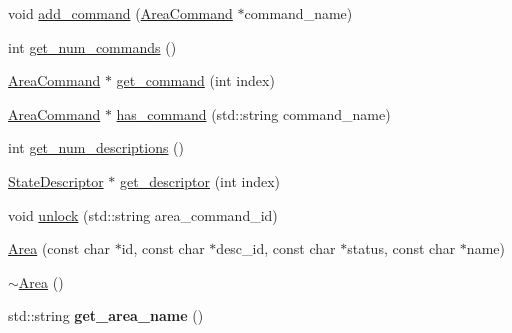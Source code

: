 \begin{DoxyCompactItemize}
\item 
void \hyperlink{class_area_a61f8a73da43dbfa8259a308cb61a28f0}{add\-\_\-command} (\hyperlink{class_area_command}{\-Area\-Command} $\ast$command\-\_\-name)
\item 
int \hyperlink{class_area_a4ba46fedbf3da57ca8bc6de3f50de0a4}{get\-\_\-num\-\_\-commands} ()
\item 
\hyperlink{class_area_command}{\-Area\-Command} $\ast$ \hyperlink{class_area_ae7ee0c8526f4b18b9aca41faf7570e8d}{get\-\_\-command} (int index)
\item 
\hyperlink{class_area_command}{\-Area\-Command} $\ast$ \hyperlink{class_area_a7ed668f761ab79669ad6fb23419b22b2}{has\-\_\-command} (std\-::string command\-\_\-name)
\item 
int \hyperlink{class_area_a917fe473912d321f631be8e1b30e5edf}{get\-\_\-num\-\_\-descriptions} ()
\item 
\hyperlink{class_state_descriptor}{\-State\-Descriptor} $\ast$ \hyperlink{class_area_a94b7cf6ce69e92cddbd4a2a4ec92fbfd}{get\-\_\-descriptor} (int index)
\item 
void \hyperlink{class_area_a6e38f449666617680d0aee968c5c9f57}{unlock} (std\-::string area\-\_\-command\-\_\-id)
\item 
\hyperlink{class_area_aebf5c02afaa711ee4a2d13be7c92b421}{\-Area} (const char $\ast$id, const char $\ast$desc\-\_\-id, const char $\ast$status, const char $\ast$name)
\item 
\hyperlink{class_area_ace0975982b61a16746c564a0d43a4cc8}{$\sim$\-Area} ()
\item 
\hypertarget{class_area_aadb3e4eb71211a2bcd495a1b98a0a9d4}{
std\-::string {\bfseries get\-\_\-area\-\_\-name} ()}
\label{class_area_aadb3e4eb71211a2bcd495a1b98a0a9d4}

\end{DoxyCompactItemize}
